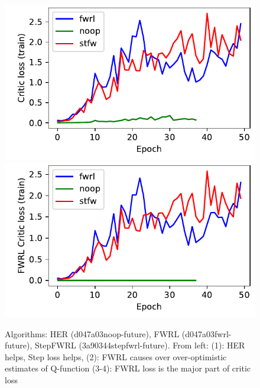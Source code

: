 \begin{figure}
  \includegraphics[width=\frac\columnwidth]{media/res/ea0e35b-FetchPush-v1-stfw-none/train/critic_loss.pdf}%
  \includegraphics[width=\frac\columnwidth]{media/res/ea0e35b-FetchPush-v1-stfw-none/train/critic_addnl_loss.pdf}
  \caption{
    Algorithms: HER (d047a03noop-future), FWRL (d047a03fwrl-future), StepFWRL
    (3a90344stepfwrl-future). 
    From left: (1): HER helps, Step loss helps,
    (2): FWRL causes over over-optimistic estimates of Q-function
    (3-4): FWRL loss is the major part of critic loss}%
  \label{fig:fwrl-stepfwrl-noop-test-sucess-rate}%
\end{figure}%
% 

